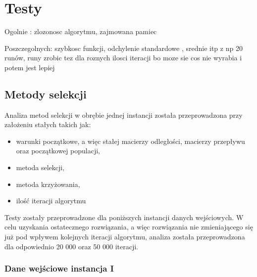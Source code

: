 \chapter{Testy}\label{cha:pierwszyDokument}

Ogolnie :
zlozonosc algorytmu, zajmowana pamiec

Poszczegolnych:
szybkosc funkcji, odchylenie standardowe , srednie itp z np 20 runów, runy zrobic tez dla roznych ilosci iteracji bo moze sie cos nie wyrabia i potem jest lepiej 

\section{Metody selekcji}\label{sec:strukturaDokumentu}

Analiza metod selekcji w obrębie jednej instancji została przeprowadzona przy założeniu stałych takich jak:
\begin{itemize}
\item
 warunki początkowe, a więc stałej macierzy odległości, macierzy przepływu oraz początkowej populacji,
\item
metoda selekcji,
\item
metoda krzyżowania,
\item
ilość iteracji algorytmu
\end{itemize}
\par
\vspace{0,4cm}
Testy zostały przeprowadzone dla poniższych instancji danych wejściowych. W celu uzyskania ostatecznego rozwiązania, a więc rozwiązania nie zmieniającego się już pod wpływem kolejnych iteracji algorytmu, analiza została przeprowadzona dla odpowiednio 20 000 oraz 50 000 iteracji.\\

\subsection{Dane wejściowe instancja I}




